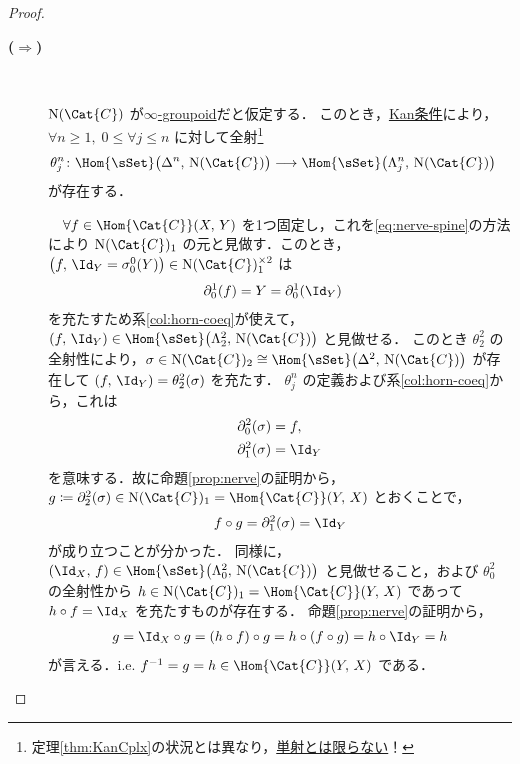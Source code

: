 \documentclass[TQFT_main]{subfiles}
\begin{document}
\begin{proof}
    \begin{description}
        \item[\textbf{($\bm{\Longrightarrow}$)}]　
        
        $\mathrm{N}(\Cat{C})$ が\hyperref[def:infinity-1]{$\infty$-groupoid}だと仮定する．
        このとき，\hyperref[def:KanCplx]{Kan条件}により，$\forall n \ge 1,\; 0 \le \forall j \le n$ に対して全射\footnote{定理\ref{thm:KanCplx}の状況とは異なり，\underline{単射とは限らない}！}
        \begin{align}
            \theta^n_j \colon \Hom{\sSet}\bigl(\Delta^n,\,\mathrm{N}(\Cat{C})\bigr) &\lto \Hom{\sSet}\bigl(\Lambda_j^n,\,\mathrm{N}(\Cat{C})\bigr)
        \end{align}
        が存在する．

        　$\forall f \in \Hom{\Cat{C}}(X,\, Y)$ を1つ固定し，これを\eqref{eq:nerve-spine}の方法により $\mathrm{N}(\Cat{C})_1$ の元と見做す．このとき，$\bigl(f,\, \Id_Y = \sigma^0_0(Y)\bigr) \in \mathrm{N}(\Cat{C})_1^{\times 2}$ は
        \begin{align}
            \partial^1_0(f) &= Y = \partial^1_0(\Id_Y)
        \end{align}
        を充たすため系\ref{col:horn-coeq}が使えて，$(f,\, \Id_Y) \in \Hom{\sSet}\bigl(\Lambda^2_2,\, \mathrm{N}(\Cat{C})\bigr)$ と見做せる．
        このとき $\theta^2_2$ の全射性により，$\sigma \in \mathrm{N}(\Cat{C})_2 \cong \Hom{\sSet} \bigl( \Delta^2,\, \mathrm{N}(\Cat{C}) \bigr)$ が存在して $(f,\, \Id_Y) = \theta^2_2(\sigma)$ を充たす．
        $\theta^n_j$ の定義および系\ref{col:horn-coeq}から，これは
        \begin{align}
            \partial^2_0 (\sigma) &= f, \\
            \partial^2_1 (\sigma) &= \Id_Y
        \end{align}
        を意味する．故に命題\ref{prop:nerve}の証明から，$g \coloneqq \partial^2_2 (\sigma) \in \mathrm{N}(\Cat{C})_1 = \Hom{\Cat{C}}(Y,\, X)$ とおくことで，
        \begin{align}
            f \circ g = \partial^2_1 (\sigma) = \Id_Y
        \end{align}
        が成り立つことが分かった．
        同様に，$(\Id_X,\, f) \in \Hom{\sSet}\bigl(\Lambda^2_0,\, \mathrm{N}(\Cat{C})\bigr)$ と見做せること，および $\theta^2_0$ の全射性から $h \in \mathrm{N}(\Cat{C})_1 = \Hom{\Cat{C}} (Y,\, X)$ であって $h \circ f = \Id_X$ を充たすものが存在する．
        命題\ref{prop:nerve}の証明から，
        \begin{align}
            g = \Id_X \circ g = (h \circ f) \circ g = h \circ (f \circ g) = h \circ \Id_Y = h
        \end{align}
        が言える．i.e. $f^{-1} = g = h \in \Hom{\Cat{C}}(Y,\, X)$ である．


\end{description}
\end{proof}
\end{document}
